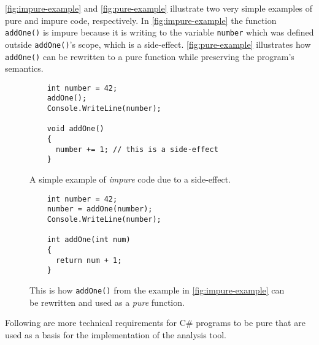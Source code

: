 \documentclass[a4paper,12pt]{article}
\begin{document}
\autoref{fig:impure-example} and \autoref{fig:pure-example} illustrate two very simple examples of pure and impure code, respectively. In \autoref{fig:impure-example} the function \texttt{addOne()} is impure because it is writing to the variable \texttt{number} which was defined outside \texttt{addOne()}'s scope, which is a side-effect. \autoref{fig:pure-example} illustrates how \texttt{addOne()} can be rewritten to a pure function while preserving the program's semantics.

\begin{figure}[H]
  \centering
  \begin{lstlisting}
    int number = 42;
    addOne();
    Console.WriteLine(number);

    void addOne()
    {
      number += 1; // this is a side-effect
    }
  \end{lstlisting}
  \caption{A simple example of \textit{impure} code due to a side-effect.}
  \label{fig:impure-example}
\end{figure}

\begin{figure}[H]
  \centering
  \begin{lstlisting}
    int number = 42;
    number = addOne(number);
    Console.WriteLine(number);

    int addOne(int num)
    {
      return num + 1;
    }
  \end{lstlisting}
  \caption{This is how \texttt{addOne()} from the example in \autoref{fig:impure-example} can be rewritten and used as a \textit{pure} function.}
  \label{fig:pure-example}
\end{figure}

Following are more technical requirements for C\# programs to be pure that are used as a basis for the implementation of the analysis tool. %

\end{document}
